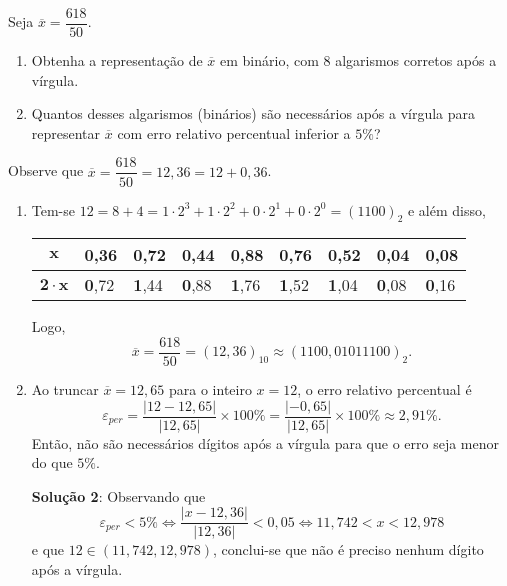 \documentclass[12pt,a4paper]{article}
\begin{document}
\begin{ExerciseList}
\Exercise[title={2,5}]
Seja $\overline{x} = \dfrac{618}{50}$.
\begin{enumerate}
\item Obtenha a representação de $\overline{x}$ em binário, com 8 algarismos corretos após a vírgula.
\item Quantos desses algarismos (binários) são necessários após a vírgula para representar $\overline{x}$ com erro relativo percentual inferior a $5\%$?
\end{enumerate}
\Answer Observe que $\overline{x} = \dfrac{618}{50} = 12,36 = 12 + 0,36$.
\begin{enumerate}
\item Tem-se $12 = 8 + 4 = 1 \cdot 2^3 + 1 \cdot 2^2 +0 \cdot 2^1 + 0 \cdot 2^0 = (1100)_{2}$ e além disso,
\begin{center}
\begin{tabular}{|c|l|l|l|l|l|l|l|l|}
\hline
$\mathbf{x}$
& 0,36 & 0,72 & 0,44 & 0,88 & 0,76 & 0,52 & 0,04 & 0,08 \\ \hline
$\mathbf{2\cdot x}$
& \textbf{0},72
& \textbf{1},44
& \textbf{0},88
& \textbf{1},76
& \textbf{1},52
& \textbf{1},04
& \textbf{0},08
& \textbf{0},16
\\ \hline
\end{tabular}
\end{center}
Logo,
\[
\overline{x}
= \dfrac{618}{50}
= (12,36)_{10}
\approx (1100,01011100)_2.
\]
\item Ao truncar $\overline{x} = 12,65$ para o inteiro $x = 12$, o erro relativo percentual é
\[
\varepsilon_{per} = \frac{|12 - 12,65|}{|12,65|} \times 100\%
                  = \frac{|-0,65|}{|12,65|} \times 100\%
                  \approx 2,91\%.
\]
Então, não são necessários dígitos após a vírgula para que o erro seja menor do que $5\%$.

\textbf{Solução 2}: Observando que
\[
\varepsilon_{per} < 5\%
\Leftrightarrow
\frac{|x-12,36|}{|12,36|} < 0,05
\Leftrightarrow
11,742< x <12,978
\]
e que $12 \in (11,742, 12,978)$, conclui-se que não é preciso nenhum dígito após a vírgula.
\end{enumerate}


\end{ExerciseList}
\end{document}
